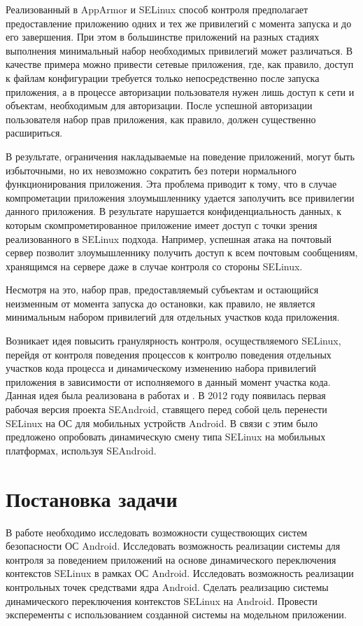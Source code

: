 Реализованный в AppArmor и SELinux способ контроля предполагает
предоставление приложению одних и тех же привилегий с момента
запуска и до его завершения. При этом в большинстве приложений
на разных стадиях выполнения минимальный набор необходимых
привилегий может различаться. В качестве примера можно привести
сетевые приложения, где, как правило, доступ к файлам конфигурации
требуется только непосредственно после запуска приложения,
а в процессе авторизации пользователя нужен лишь доступ к сети и
объектам, необходимым для авторизации. После успешной авторизации
пользователя набор прав приложения, как правило, должен существенно
расшириться.

В результате, ограничения накладываемые на поведение приложений,
могут быть избыточными, но их невозможно сократить без потери
нормального функционирования приложения. Эта проблема приводит
к тому, что в случае компрометации приложения злоумышленнику удается
заполучить все привилегии данного приложения. В результате нарушается
конфиденциальность данных, к которым скомпрометированное приложение
имеет доступ с точки зрения реализованного в SELinux подхода.
Например, успешная атака на почтовый сервер позволит злоумышленнику
получить доступ к всем почтовым сообщениям, хранящимся на сервере даже
в случае контроля со стороны SELinux.

Несмотря на это, набор прав, предоставляемый субъектам 
и остающийся неизменным от момента запуска до остановки,
как правило, не является минимальным набором привилегий
для отдельных участков кода приложения.

Возникает идея повысить гранулярность контроля, осуществляемого SELinux,
перейдя от контроля поведения процессов к контролю поведения отдельных
участков кода процесса и динамическому изменению набора привилегий
приложения в зависимости от исполняемого в данный момент участка кода.
Данная идея была реализована в работах \cite{sacharov} и \cite{bush}. В
2012 году появилась первая рабочая версия проекта SEAndroid, ставящего
перед собой цель перенести SELinux на ОС для мобильных устройств
Android. В связи с этим было предложено опробовать динамическую смену
типа SELinux на мобильных платформах, используя SEAndroid.
 
\newpage
\section{Постановка задачи}

В работе необходимо исследовать возможности существоющих систем
безопасности ОС Android. Исследовать возможность реализации системы для
контроля за поведением приложений на основе динамического переключения
контекстов SELinux в рамках ОС Android.  Исследовать возможность
реализации контрольных точек средствами ядра Android. Сделать реализацию
системы динамического переключения контекстов SELinux на Android.
Провести эксперементы с использованием созданной системы на модельном
приложении.

